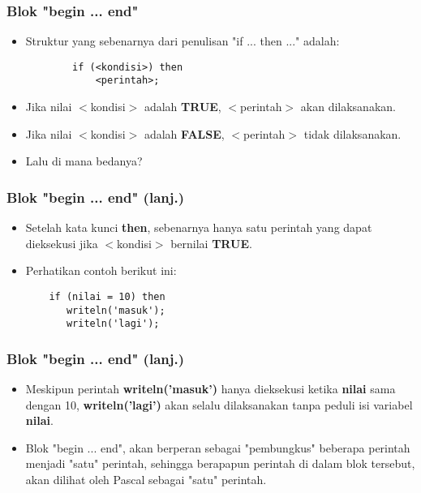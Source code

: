 \documentclass{beamer}
\begin{document}
\begin{frame}[fragile]
\frametitle{Blok "begin ... end"}
\begin{itemize}
	\item Struktur yang sebenarnya dari penulisan "if ... then ..." adalah:
	\begin{lstlisting}
		if (<kondisi>) then
		    <perintah>;
	\end{lstlisting}
	\item Jika nilai $<$kondisi$>$ adalah \textbf{TRUE}, $<$perintah$>$ akan dilaksanakan.
	\item Jika nilai $<$kondisi$>$ adalah \textbf{FALSE}, $<$perintah$>$ tidak dilaksanakan.
	\item Lalu di mana bedanya?
\end{itemize}
\end{frame}

\begin{frame}[fragile]
\frametitle{Blok "begin ... end" (lanj.)}
\begin{itemize}
	\item Setelah kata kunci \textbf{then}, sebenarnya hanya \alert{satu} perintah yang dapat dieksekusi jika $<$kondisi$>$ bernilai \textbf{TRUE}.
	\item Perhatikan contoh berikut ini:
	\begin{lstlisting}
	if (nilai = 10) then
	   writeln('masuk');
	   writeln('lagi');
	\end{lstlisting}
\end{itemize}
\end{frame}

\begin{frame}[fragile]
\frametitle{Blok "begin ... end" (lanj.)}
\begin{itemize}
	\item Meskipun perintah \textbf{writeln('masuk')} hanya dieksekusi ketika \textbf{nilai} sama dengan 10, \textbf{writeln('lagi')} akan \alert{selalu dilaksanakan} tanpa peduli isi variabel \textbf{nilai}.
	\item Blok "begin ... end", akan berperan sebagai "pembungkus" beberapa perintah menjadi "satu" perintah, sehingga berapapun perintah di dalam blok tersebut, akan dilihat oleh Pascal sebagai "satu" perintah.
\end{itemize}
\end{frame}
\end{document}
